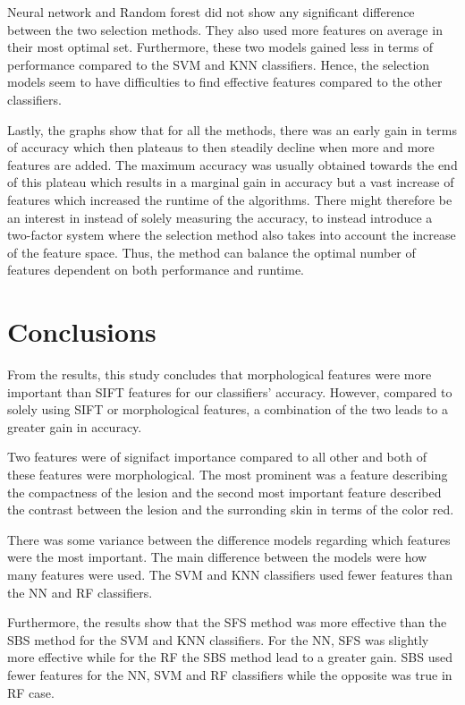 \documentclass{kththesis}
\begin{document}
Neural network and Random forest did not show any significant difference between the two selection methods. They also used more features on average in their most optimal set. Furthermore, these two models gained less in terms of performance compared to the SVM and KNN classifiers. Hence, the selection models seem to have difficulties to find effective features compared to the other classifiers.

Lastly, the graphs show that for all the methods, there was an early gain in terms of accuracy which then plateaus to then steadily decline when more and more features are added. The maximum accuracy was usually obtained towards the end of this plateau which results in a marginal gain in accuracy but a vast increase of features which increased the runtime of the algorithms. There might therefore be an interest in instead of solely measuring the accuracy, to instead introduce a two-factor system where the selection method also takes into account the increase of the feature space. Thus, the method can balance the optimal number of features dependent on both performance and runtime.


\chapter{Conclusions}

From the results, this study concludes that morphological features were more important than SIFT features for our classifiers' accuracy. However, compared to solely using SIFT or morphological features, a combination of the two leads to a greater gain in accuracy.

Two features were of signifact importance compared to all other and both of these features were morphological. The most prominent was a feature describing the compactness of the lesion and the second most important feature described the contrast between the lesion and the surronding skin in terms of the color red.

There was some variance between the difference models regarding which features were the most important. The main difference between the models were how many features were used. The SVM and KNN classifiers used fewer features than the NN and RF classifiers. 

Furthermore, the results show that the SFS method was more effective than the SBS method for the SVM and KNN classifiers. For the NN, SFS was slightly more effective while for the RF the SBS method lead to a greater gain. SBS used fewer features for the NN, SVM and RF classifiers while the opposite was true in RF case.

\printbibliography[heading=bibintoc]


\tailmatter
\end{document}
